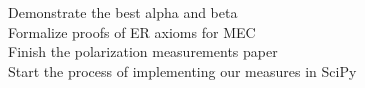 \documentclass[preview]{standalone}
\begin{document}
Demonstrate the best alpha and beta\\Formalize proofs of ER axioms for MEC\\Finish the polarization measurements paper\\Start the process of implementing our measures in SciPy\\
\end{document}

